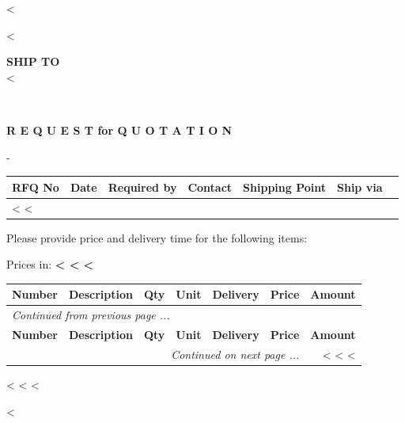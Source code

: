 <%

\begin{CJK}{UTF8}{arialuni}

\vspace*{-3.3cm}
<%
\vspace{0.5cm}

\parbox[t]{.80\textwidth}{
\textbf{SHIP TO} \\
<%
}

\hfill \\

\vspace{0.5cm}

\centerline{\textbf{R E Q U E S T  for  Q U O T A T I O N}}
\normalsize

\vspace{0.5cm}
-
\vspace{0.2cm}

\begin{tabularx}{\textwidth}{*{7}{|X}|} \hline
  \textbf{RFQ No} & \textbf{Date} & \textbf{Required by} & \textbf{Contact}
  & \textbf{Shipping Point} & \textbf{Ship via} \\ [0.5em]
  \hline
  <%
  <%
  \hline
\end{tabularx}

\parbox{\textwidth}{
\vspace{1.0cm}
Please provide price and delivery time for the following items:
}

\vspace{0.5cm}
	Prices in: \textbf{<%
<%
<%
}
\vspace{0.5cm} 

\begin{longtable}{|l p{5.5cm} @{\extracolsep\fill} rclrr|} \hline
  \textbf{Number} & \textbf{Description} & \textbf{Qty} & \textbf{Unit}  & \textbf{Delivery} & \textbf{Price} & \textbf{Amount} \\     
  \hline
\endfirsthead
  \multicolumn{6}{l}{\emph{Continued from previous page ...}} \\
  \hline
  \textbf{Number} & \textbf{Description} & \textbf{Qty} & \textbf{Unit}  & \textbf{Delivery} & \textbf{Price} & \textbf{Amount} \\     
  \hline
\endhead
   \hline \multicolumn{6}{r}{\emph{Continued on next page ...}}
\endfoot
   \hline
\endlastfoot
<%
  <%
  <%
		& <%
	<%
<%
\end{longtable}

\parbox{\textwidth}{
\vspace{0.5cm}
<%
  <%
<%
}

\vfill
<%
\end{CJK}

